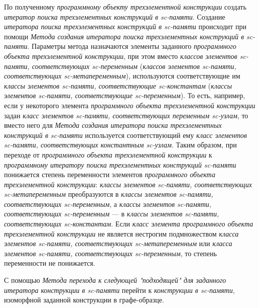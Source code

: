 \begin{textitemize}
	\item По полученному \textit{программному объекту трехэлементной конструкции} создать \textit{итератор поиска трехэлементных конструкций в sc-памяти}. Создание \textit{итератора поиска трехэлементных конструкций в sc-памяти} происходит при помощи \textit{Метода создания итератора поиска трехэлементных конструкций в sc-памяти}. Параметры метода назначаются элементы заданного \textit{программного объекта трехэлементной конструкции}, при этом вместо \textit{классов элементов sc-памяти, соответствующих sc-переменным} (\textit{классов элементов sc-памяти, соответствующих sc-метапеременным}), используются соответствующие им \textit{классы элементов sc-памяти, соответствующие sc-константам} (\textit{классы элементов sc-памяти, соответствующие sc-переменным}). То есть, например, если у некоторого элемента \textit{программного объекта трехэлементной конструкции} задан \textit{класс элементов sc-памяти, соответствующих переменным sc-узлам}, то вместо него для \textit{Метода создания итератора поиска трехэлементных конструкций в sc-памяти} используется соответствующий ему \textit{класс элементов sc-памяти, соответствующих константным sc-узлам}. Таким образом, при переходе от \textit{программного объекта трехэлементной конструкции} к \textit{программному итератору поиска трехэлементных конструкций sc-памяти} понижается степень переменности элементов \textit{программного объекта трехэлементной конструкции}: \textit{классы элементов sc-памяти, соответствующих sc-метапеременным} преобразуются в \textit{классы элементов sc-памяти, соответствующих sc-переменным}, а \textit{классы элементов sc-памяти, соответствующих sc-переменным} --- в \textit{классы элементов sc-памяти, соответствующих sc-константам}. Если \textit{класс элемента программного объекта трехэлементной конструкции} не является нестрогим подмножеством \textit{класса элементов sc-памяти, соответствующих sc-метапеременным} или \textit{класса элементов sc-памяти, соответствующих sc-переменным}, то степень переменности не понижается.
	\item С помощью \textit{Метода перехода к следующей "подходящей" для заданного итератора конструкции в sc-памяти} перейти к \textit{конструкции в sc-памяти}, изоморфной заданной конструкции в графе-образце.
\end{textitemize}

